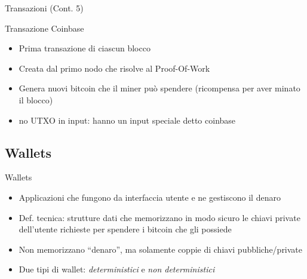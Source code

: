 \documentclass{beamer}
\begin{document}
  \begin{frame}{Transazioni (Cont. 5)}
    \begin{block}{Transazione Coinbase}
      \begin{itemize}
        \item Prima transazione di ciascun blocco
        \item Creata dal primo nodo che risolve al Proof-Of-Work
        \item Genera nuovi bitcoin che il miner può spendere (ricompensa per aver minato il blocco)
        \item no UTXO in input: hanno un input speciale detto coinbase
      \end{itemize}
    \end{block}
  \end{frame}





  \subsection{Wallets}
  \begin{frame}{Wallets}
    \begin{itemize}
      \item Applicazioni che fungono da interfaccia utente e ne gestiscono il denaro 
      \item Def. tecnica: strutture dati che memorizzano in modo sicuro le chiavi private dell'utente richieste per spendere i bitcoin che gli possiede 
      \item Non memorizzano ``denaro'', ma solamente coppie di chiavi pubbliche/private
      \item Due tipi di wallet: \emph{deterministici} e \emph{non deterministici}
    \end{itemize}
  \end{frame}




\end{document}
